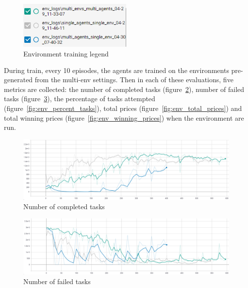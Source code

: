 \begin{figure}
    \includegraphics[width=0.5\textwidth]{figures/4_test_eval_figs/env_training_fig/legend.png}
    \caption{Environment training legend}
    \label{fig:env-training-legend}
\end{figure}

During train, every 10 episodes, the agents are trained on the environments pre-generated from the multi-env settings.
Then in each of these evaluations, five metrics are collected: the number of completed tasks
(figure~\ref{fig:env_num_completed_tasks}), number of failed tasks (figure~\ref{fig:env_num_failed_tasks}),
the percentage of tasks attempted (figure~\ref{fig:env_percent_tasks}), total prices (figure~\ref{fig:env_total_prices})
and total winning prices (figure~\ref{fig:env_winning_prices}) when the environment are run.



\begin{figure}[h]
    \centering
    \includegraphics[width=17cm]{figures/4_test_eval_figs/env_training_fig/num_completed_tasks.png}
    \caption{Number of completed tasks}
    \label{fig:env_num_completed_tasks}
\end{figure}

\begin{figure}[h]
    \centering
    \includegraphics[width=17cm]{figures/4_test_eval_figs/env_training_fig/num_failed_tasks.png}
    \caption{Number of failed tasks}
    \label{fig:env_num_failed_tasks}
\end{figure}

